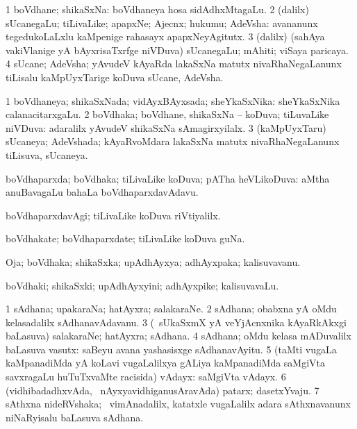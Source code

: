 \bentry
{}
\gl{\nA}
\expl{}
\bmng
\bnum
\num{1} boVdhane; shikaSxNa:  boVdhaneya hosa sidAdhxMtagaLu. 
\num{2} (\bava dalilx) sUcanegaLu; tiLivaLike; apapxNe; Ajecnx; hukumu; AdeVsha:  avananunx tegedukoLaLxlu kaMpenige rahasayx apapxNeyAgitutx. 
\num{3} (\bava dalilx) (sahAya vakiVlanige yA bAyxrisaTxrfge niVDuva) sUcanegaLu; mAhiti; viSaya paricaya. 
\num{4} sUcane; AdeVsha; yAvudeV kAyaRda lakaSxNa matutx nivaRhaNegaLanunx tiLisalu kaMpUyxTarige koDuva sUcane, AdeVsha. 
\enum
\emng
\eentry

\bentry
{}
\gl{\gu}
\bmng
\bnum
\num{1} boVdhaneya; shikaSxNada; vidAyxBAyxsada; sheYkaSxNika:  sheYkaSxNika calanacitarxgaLu. 
\num{2} boVdhaka; boVdhane, shikaSxNa -- koDuva; tiLuvaLike niVDuva:  adaralilx yAvudeV shikaSxNa sAmagirxyilalx. 
\num{3} (kaMpUyxTaru) sUcaneya; AdeVshada; kAyaRvoMdara lakaSxNa matutx nivaRhaNegaLanunx tiLisuva, sUcaneya. 
\enum
\emng
\eentry

\bentry
{}
\gl{\gu}
\bmng
boVdhaparxda; boVdhaka; tiLivaLike koDuva; pATha heVLikoDuva:  aMtha anuBavagaLu bahaLa boVdhaparxdavAdavu. 
\emng
\eentry

\bentry
{}
\gl{\kirxvi}
\bmng
boVdhaparxdavAgi; tiLivaLike koDuva riVtiyalilx. 
\emng
\eentry

\bentry
{}
\gl{\nA}
\bmng
boVdhakate; boVdhaparxdate; tiLivaLike koDuva guNa. 
\emng
\eentry

\bentry
{}
\gl{\nA}
\bmng
Oja; boVdhaka; shikaSxka; upAdhAyxya; adhAyxpaka; kalisuvavanu. 
\emng
\eentry

\bentry
{}
\gl{\nA}
\bmng
boVdhaki; shikaSxki; upAdhAyxyini; adhAyxpike; kalisuvavaLu. 
\emng
\eentry

\bentry
{}
\gl{\nA}
\bmng
\bnum
\num{1} sAdhana; upakaraNa; hatAyxra; salakaraNe. 
\num{2} sAdhana; obabxna yA oMdu kelasadalilx sAdhanavAdavanu. 
\num{3} (\kanmu\ sUkaSxmX yA veYjAcnxnika kAyaRkAkxgi baLasuva) salakaraNe; hatAyxra; sAdhana. 
\num{4} sAdhana; oMdu kelasa mADuvalilx baLasuva vasutx:  saBeyu avana yashasisxge sAdhanavAyitu. 
\num{5} (taMti \mo vugaLa kaMpanadiMda yA koLavi \mo vugaLalilxya gALiya kaMpanadiMda saMgiVta savxragaLu huTuTxvaMte racisida) vAdayx:  saMgiVta vAdayx. 
\num{6} (vidhibadadhxvAda, \kanmu\ nAyxyavidhiganusAravAda) patarx; dasetxYvaju. 
\num{7} sAthxna nideRVshaka; \kanmu\ vimAnadalilx, katatxle \mo vugaLalilx adara sAthxnavanunx niNaRyisalu baLasuva sAdhana. 
\enum
\emng

